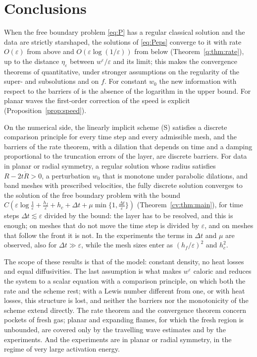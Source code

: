 \documentclass[11pt]{amsart}
\theoremstyle{definition}
\theoremstyle{remark}
\newcommand{\ve}{\varepsilon}
\begin{document}
\section{Conclusions}\label{sec:conclusions}

When the free boundary problem \eqref{eq:P} has a regular classical solution and the
data are strictly starshaped, the solutions of \eqref{eq:Peps} converge to it with
rate $O(\ve)$ from above and $O(\ve\log(1/\ve))$ from below
(Theorem~\ref{q:thm:rate}), up to the distance $\eta_\ve$ between $w^\ve/\ve$ and its limit;
this makes the convergence theorems of
\cite{FernandezBonderWolanski2004} quantitative, under stronger assumptions on the
regularity of the super- and subsolutions and on $f$. For constant $w_0$ the new
information with respect to the barriers of \cite{Petrosyan2002} is the absence of the
logarithm in the upper bound. For planar waves the first-order
correction of the speed is explicit (Proposition~\ref{prop:speed}).

On the numerical side, the linearly implicit scheme (S) satisfies a discrete
comparison principle for every time step and every admissible mesh, and the barriers
of the rate theorem, with a dilation that depends on time and a damping proportional
to the truncation errors of the layer, are discrete barriers. For data in planar or
radial symmetry, a regular solution whose radius satisfies $R-2t\dot R>0$, a perturbation
$w_0$ that is monotone under parabolic dilations, and band
meshes with prescribed velocities, the fully discrete solution
converges to the solution of the free boundary problem with the bound
$C(\ve\log\frac1\ve+\frac{h_f}\ve+h_c+\Delta t+\mu\min\{1,\frac{\Delta t}\ve\})$
(Theorem~\ref{cv:thm:main}), for time steps $\Delta t\lesssim\ve$ divided by the bound: the layer
has to be resolved, and this is enough; on meshes that do not move the time step is divided
by $\ve$, and on meshes that follow the front it is not. In the experiments the terms in
$\Delta t$ and $\mu$ are observed, also for $\Delta t\gg\ve$, while the mesh sizes enter as
$(h_f/\ve)^2$ and $h_c^2$.

The scope of these results is that of the model: constant density, no heat losses and
equal diffusivities. The last assumption is what makes $w^\ve$ caloric and reduces the
system to a scalar equation with a comparison principle, on which both the rate and the
scheme rest; with a Lewis number different from one, or with heat losses, this structure
is lost, and neither the barriers nor the monotonicity of the scheme extend directly. The
rate theorem and the convergence theorem concern pockets of fresh gas; planar and
expanding flames, for which the fresh region is unbounded, are covered only by the
travelling wave estimates and by the experiments. And the experiments are in planar or
radial symmetry, in the regime of very large activation energy.
\end{document}
